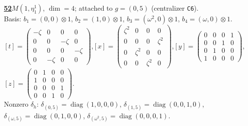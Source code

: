 \begin{samepage}\noindent\textbf{\underline{52}}\quad $M(1,\eta^{1}_{1})$, $\dim=4$; attached to $g=(0,5)$ (centralizer \texttt{C6}).\\
Basis: $b_{1}=(0,0)\otimes 1$, $b_{2}=(1,0)\otimes 1$, $b_{3}=(\omega^2,0)\otimes 1$, $b_{4}=(\omega,0)\otimes 1$.\\
$[t]=\left(\begin{smallmatrix} -\zeta & 0 & 0 & 0 \\ 0 & 0 & -\zeta & 0 \\ 0 & 0 & 0 & -\zeta \\ 0 & -\zeta & 0 & 0 \end{smallmatrix}\right)$,\quad $[x]=\left(\begin{smallmatrix} \zeta^2 & 0 & 0 & 0 \\ 0 & 0 & 0 & \zeta^2 \\ 0 & \zeta^2 & 0 & 0 \\ 0 & 0 & \zeta^2 & 0 \end{smallmatrix}\right)$,\quad $[y]=\left(\begin{smallmatrix} 0 & 0 & 0 & 1 \\ 0 & 0 & 1 & 0 \\ 0 & 1 & 0 & 0 \\ 1 & 0 & 0 & 0 \end{smallmatrix}\right)$,\quad $[z]=\left(\begin{smallmatrix} 0 & 1 & 0 & 0 \\ 1 & 0 & 0 & 0 \\ 0 & 0 & 0 & 1 \\ 0 & 0 & 1 & 0 \end{smallmatrix}\right)$.\\
Nonzero $\delta_h$: $\delta_{(0,5)}=\operatorname{diag}(1,0,0,0)$, $\delta_{(1,5)}=\operatorname{diag}(0,0,1,0)$, $\delta_{(\omega,5)}=\operatorname{diag}(0,1,0,0)$, $\delta_{(\omega^2,5)}=\operatorname{diag}(0,0,0,1)$.\end{samepage}
\medskip

